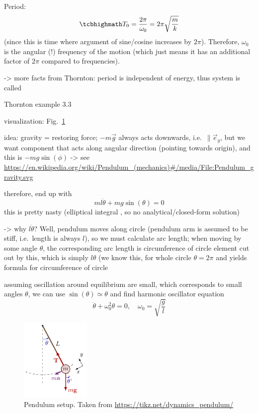 \documentclass[../class_mech_main.tex]{subfiles}
\begin{document}
Period:
\begin{equation}
	\eqbox{
		T_0 = \frac{2\pi}{\omega_0} = 2\pi \sqrt{\frac{m}{k}}
	}
\end{equation}
(since this is time where argument of sine/cosine increases by $2\pi$). Therefore, $\omega_0$ is the angular (!) frequency of the motion (which just means it has an additional factor of $2\pi$ compared to frequencies).

-> more facts from Thornton: period is independent of energy, thus system is called 



\begin{ex}[Pendulum]
	Thornton example 3.3

	visualization: Fig.~\ref{fig:pendulum}


	idea: gravity = restoring force; $- m \vec{g}$ always acts downwards, i.e.~$\parallel \vec{e}_y$, but we want component that acts along angular direction (pointing towards origin), and this is $- m g \sin(\phi)$ -> see \url{https://en.wikipedia.org/wiki/Pendulum_(mechanics)#/media/File:Pendulum_gravity.svg}

	therefore, end up with
	\begin{equation}
		m l \ddot{\theta} + m g \sin(\theta) = 0
	\end{equation}
	this is pretty nasty (elliptical integral , so no analytical/closed-form solution)

	-> why $l \ddot{\theta}$? Well, pendulum moves along circle (pendulum arm is assumed to be stiff, i.e.~length is always $l$), so we must calculate arc length; when moving by some angle $\theta$, the corresponding arc length is circumference of circle element cut out by this, which is simply $l \theta$ (we know this, for whole circle $\theta = 2\pi$ and yields formula for circumference of circle

	assuming oscillation around equilibrium are small, which corresponds to small angles $\theta$, we can use $\sin(\theta) \simeq \theta$ and find harmonic oscillator equation
	\begin{equation}
		\ddot{\theta} + \omega_0^2 \theta = 0, \quad \omega_0 = \sqrt{\frac{g}{l}}
	\end{equation}
\end{ex}



\begin{figure}
	\centering

	\includegraphics[width=0.3\textwidth]{pictures/pendulum.pdf}

	\caption{Pendulum setup. Taken from \url{https://tikz.net/dynamics_pendulum/}}
	\label{fig:pendulum}
\end{figure}
\end{document}
